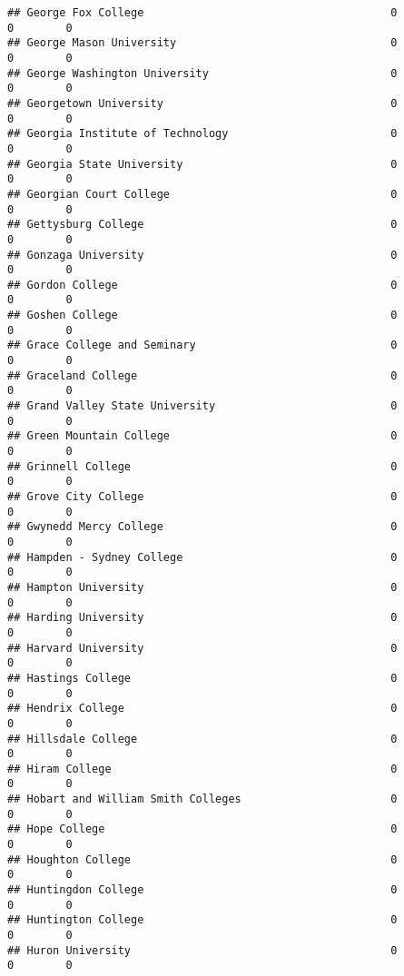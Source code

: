 \documentclass[
]{article}
\begin{document}
\begin{verbatim}
## George Fox College                                      0           0        0
## George Mason University                                 0           0        0
## George Washington University                            0           0        0
## Georgetown University                                   0           0        0
## Georgia Institute of Technology                         0           0        0
## Georgia State University                                0           0        0
## Georgian Court College                                  0           0        0
## Gettysburg College                                      0           0        0
## Gonzaga University                                      0           0        0
## Gordon College                                          0           0        0
## Goshen College                                          0           0        0
## Grace College and Seminary                              0           0        0
## Graceland College                                       0           0        0
## Grand Valley State University                           0           0        0
## Green Mountain College                                  0           0        0
## Grinnell College                                        0           0        0
## Grove City College                                      0           0        0
## Gwynedd Mercy College                                   0           0        0
## Hampden - Sydney College                                0           0        0
## Hampton University                                      0           0        0
## Harding University                                      0           0        0
## Harvard University                                      0           0        0
## Hastings College                                        0           0        0
## Hendrix College                                         0           0        0
## Hillsdale College                                       0           0        0
## Hiram College                                           0           0        0
## Hobart and William Smith Colleges                       0           0        0
## Hope College                                            0           0        0
## Houghton College                                        0           0        0
## Huntingdon College                                      0           0        0
## Huntington College                                      0           0        0
## Huron University                                        0           0        0

\end{verbatim}
\end{document}
